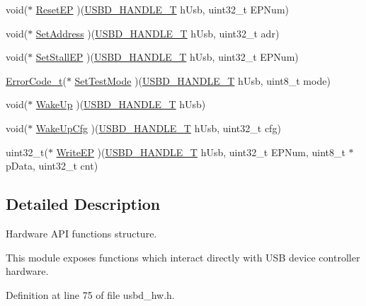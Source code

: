 \begin{DoxyCompactItemize}
\item 
void($\ast$ \hyperlink{structUSBD__HW__API_a629b49eb3e97f88baebfd125643787ae}{Reset\+EP} )(\hyperlink{group__USBD__Core_gafdbb2204d929cb9d75736bd2b42342ac}{U\+S\+B\+D\+\_\+\+H\+A\+N\+D\+L\+E\+\_\+T} h\+Usb, uint32\+\_\+t E\+P\+Num)
\item 
void($\ast$ \hyperlink{structUSBD__HW__API_a6ebb5432603102039aade6822b082c8f}{Set\+Address} )(\hyperlink{group__USBD__Core_gafdbb2204d929cb9d75736bd2b42342ac}{U\+S\+B\+D\+\_\+\+H\+A\+N\+D\+L\+E\+\_\+T} h\+Usb, uint32\+\_\+t adr)
\item 
void($\ast$ \hyperlink{structUSBD__HW__API_a320c4cb40c872179e8a53e3ab028e1c2}{Set\+Stall\+EP} )(\hyperlink{group__USBD__Core_gafdbb2204d929cb9d75736bd2b42342ac}{U\+S\+B\+D\+\_\+\+H\+A\+N\+D\+L\+E\+\_\+T} h\+Usb, uint32\+\_\+t E\+P\+Num)
\item 
\hyperlink{error_8h_a905255056c349318139d94aa4523d516}{Error\+Code\+\_\+t}($\ast$ \hyperlink{structUSBD__HW__API_a09ee889ca9547f99112dd8d0655f7e7b}{Set\+Test\+Mode} )(\hyperlink{group__USBD__Core_gafdbb2204d929cb9d75736bd2b42342ac}{U\+S\+B\+D\+\_\+\+H\+A\+N\+D\+L\+E\+\_\+T} h\+Usb, uint8\+\_\+t mode)
\item 
void($\ast$ \hyperlink{structUSBD__HW__API_aaf44f0d6be8e7e49782addd889cc7b98}{Wake\+Up} )(\hyperlink{group__USBD__Core_gafdbb2204d929cb9d75736bd2b42342ac}{U\+S\+B\+D\+\_\+\+H\+A\+N\+D\+L\+E\+\_\+T} h\+Usb)
\item 
void($\ast$ \hyperlink{structUSBD__HW__API_a9b6402065d4944bbd58235202fbd979f}{Wake\+Up\+Cfg} )(\hyperlink{group__USBD__Core_gafdbb2204d929cb9d75736bd2b42342ac}{U\+S\+B\+D\+\_\+\+H\+A\+N\+D\+L\+E\+\_\+T} h\+Usb, uint32\+\_\+t cfg)
\item 
uint32\+\_\+t($\ast$ \hyperlink{structUSBD__HW__API_a6565f11d655f825d13c9d197925fd1cb}{Write\+EP} )(\hyperlink{group__USBD__Core_gafdbb2204d929cb9d75736bd2b42342ac}{U\+S\+B\+D\+\_\+\+H\+A\+N\+D\+L\+E\+\_\+T} h\+Usb, uint32\+\_\+t E\+P\+Num, uint8\+\_\+t $\ast$p\+Data, uint32\+\_\+t cnt)
\end{DoxyCompactItemize}


\subsection{Detailed Description}
Hardware A\+PI functions structure.

This module exposes functions which interact directly with U\+SB device controller hardware. 

Definition at line 75 of file usbd\+\_\+hw.\+h.



